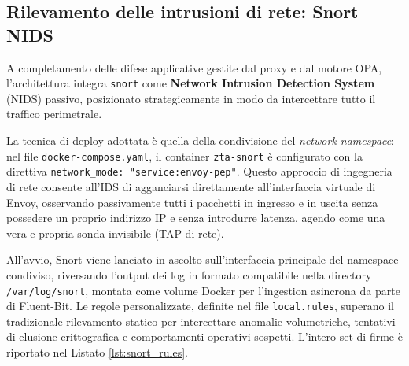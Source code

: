 \subsection{Rilevamento delle intrusioni di rete: Snort NIDS}
A completamento delle difese applicative gestite dal proxy e dal motore OPA, l'architettura integra \texttt{snort} come \textbf{Network Intrusion Detection System} (NIDS) passivo, posizionato strategicamente in modo da intercettare tutto il traffico perimetrale.

La tecnica di deploy adottata è quella della condivisione del \textit{network namespace}: nel file \texttt{docker-compose.yaml}, il container \texttt{zta-snort} è configurato con la direttiva \texttt{network\_mode: "service:envoy-pep"}. Questo approccio di ingegneria di rete consente all'IDS di agganciarsi direttamente all'interfaccia virtuale di Envoy, osservando passivamente tutti i pacchetti in ingresso e in uscita senza possedere un proprio indirizzo IP e senza introdurre latenza, agendo come una vera e propria sonda invisibile (TAP di rete).

All'avvio, Snort viene lanciato in ascolto sull'interfaccia principale del namespace condiviso, riversando l'output dei log in formato compatibile nella directory \texttt{/var/log/snort}, montata come volume Docker per l'ingestion asincrona da parte di Fluent-Bit. Le regole personalizzate, definite nel file \texttt{local.rules}, superano il tradizionale rilevamento statico per intercettare anomalie volumetriche, tentativi di elusione crittografica e comportamenti operativi sospetti. L'intero set di firme è riportato nel Listato \ref{lst:snort_rules}.

